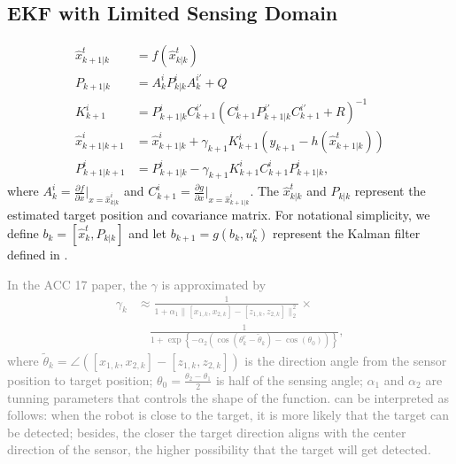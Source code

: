 \documentclass[letterpaper, 10 pt, conference]{ieeeconf}  %
\begin{document}
\subsection{EKF with Limited Sensing Domain}\label{subseq:KF with FOV}
\begin{subequations}\label{eqn:KF}
	\begin{align}
	\hat{x}^t_{k+1|k}&=f(\hat{x}^t_{k|k})\\
	P_{k+1|k}&=A^i_kP^i_{k|k}A^{i'}_k+Q\\
	K^i_{k+1}&=P^i_{k+1|k}C^{i'}_{k+1}(C^i_{k+1}P^{i'}_{k+1|k}C^{i'}_{k+1}+R)^{-1}\\
	\hat{x}^i_{k+1|k+1}&=\hat{x}^i_{k+1|k}+\gamma_{k+1}K^i_{k+1}(y_{k+1}-h(\hat{x}^t_{k+1|k}))\label{subeqn:upd_mean}\\
	P^i_{k+1|k+1}&=P^i_{k+1|k}-\gamma_{k+1}K^i_{k+1}C^i_{k+1}P^i_{k+1|k}\label{subeqn:upd_cov},
	\end{align}
\end{subequations}
where $A^i_k=\frac{\partial f}{\partial x}|_{x=\hat{x}^i_{k|k}}$ and $C^i_{k+1}=\frac{\partial g}{\partial x}|_{x=\hat{x}^i_{k+1|k}}$. 
The $\hat{x}^t_{k|k}$ and $P_{k|k}$ represent the estimated target position and covariance matrix.
For notational simplicity, we define $b_k=[\hat{x}^t_k,P_{k|k}]$ and let $b_{k+1}=g(b_k,u^r_k)$ represent the Kalman filter defined in .

\textcolor{gray}{In the ACC 17 paper, the $\gamma$ is approximated by
\begin{equation}\label{eqn:old_gamma}
\begin{split}
\gamma_{k}&\approx \frac{1}{1+\alpha_1\|[x_{1,k},x_{2,k}]-[z_{1,k},z_{2,k}]\|_2^2}\times\\
&\quad\frac{1}{1+\exp{\left\lbrace-\alpha_2(\cos(\theta^r_k-\tilde{\theta}_k)-\cos(\theta_0))\right\rbrace}},
\end{split}
\end{equation}
where $\tilde{\theta}_k=\angle([x_{1,k},x_{2,k}]-[z_{1,k},z_{2,k}])$ is the direction angle from the sensor position to target position; $\theta_0=\frac{\theta_2-\theta_1}{2}$ is half of the sensing angle; $\alpha_1$ and $\alpha_2$ are tunning parameters that controls the shape of the function. 
 can be interpreted as follows:
when the robot is close to the target, it is more likely that the target can be detected; besides, the closer the target direction aligns with the center direction of the sensor, the higher possibility that the target will get detected.}
\end{document}
